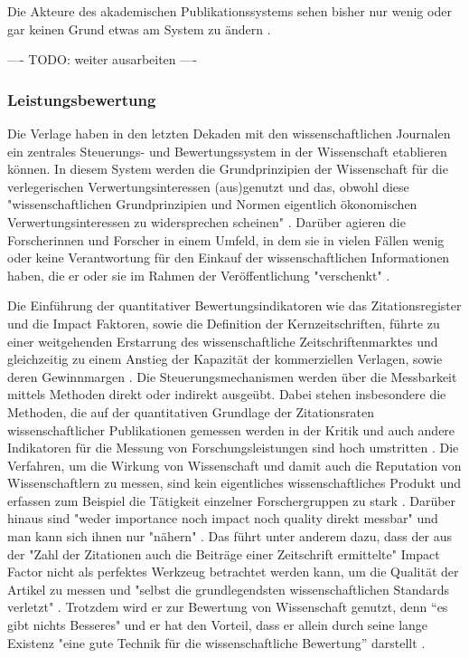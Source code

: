 Die Akteure des akademischen Publikationssystems sehen bisher nur wenig oder gar keinen Grund etwas am System zu ändern \cite{Parks_2002_acadamic_faust}.

---- TODO: weiter ausarbeiten ----

\subsubsection[Leistungsbewertung und Qualität in der Wissenschaft]{Leistungsbewertung}

Die Verlage haben in den letzten Dekaden mit den wissenschaftlichen Journalen ein zentrales Steuerungs- und Bewertungssystem in der Wissenschaft etablieren können. In diesem System werden die Grundprinzipien der Wissenschaft für die verlegerischen Verwertungsinteressen (aus)genutzt und das, obwohl diese "wissenschaftlichen Grundprinzipien und Normen eigentlich ökonomischen Verwertungsinteressen zu widersprechen scheinen" \cite{hanekop_2006}. Darüber agieren die Forscherinnen und Forscher in einem Umfeld, in dem sie in vielen Fällen wenig oder keine Verantwortung für den Einkauf der wissenschaftlichen Informationen haben, die er oder sie im Rahmen der Veröffentlichung "verschenkt" \cite{steele_2006}.

Die Einführung der quantitativer Bewertungsindikatoren wie das Zitationsregister und die Impact Faktoren, sowie die Definition der Kernzeitschriften, führte zu einer weitgehenden Erstarrung des wissenschaftliche Zeitschriftenmarktes und gleichzeitig zu einem Anstieg der Kapazität der kommerziellen Verlagen, sowie deren Gewinnmargen \cite{CREATe_2014}. Die Steuerungsmechanismen werden über die Messbarkeit mittels Methoden direkt oder indirekt ausgeübt. Dabei stehen insbesondere die Methoden, die auf der quantitativen Grundlage der Zitationsraten wissenschaftlicher Publikationen gemessen werden in der Kritik \cite{Brembs_2013} \cite{Dong_2005} und auch andere Indikatoren für die Messung von Forschungsleistungen sind hoch umstritten \cite{Hornbostel_1997} \cite{Hicks_1996} \cite{Havemann_2002}. Die Verfahren, um die Wirkung von Wissenschaft und damit auch die Reputation von Wissenschaftlern zu messen, sind kein eigentliches wissenschaftliches Produkt \cite{suchen} und erfassen zum Beispiel die Tätigkeit einzelner Forschergruppen zu stark \cite{schmoch_2009}. Darüber hinaus sind "weder importance noch impact noch quality direkt messbar" und man kann sich ihnen nur "nähern" \cite{Hornbostel_1997}. Das führt unter anderem dazu, dass der aus der "Zahl der Zitationen auch die Beiträge einer Zeitschrift ermittelte" \cite{weishaupt_2009_goldenOA} Impact Factor nicht als perfektes Werkzeug betrachtet werden kann, um die Qualität der Artikel zu messen \cite{garfield_1999} und "selbst die grundlegendsten wissenschaftlichen Standards verletzt" \cite{Brembs_20013}. Trotzdem wird er zur Bewertung von Wissenschaft genutzt, denn “es gibt nichts Besseres" und er hat den Vorteil, dass er allein durch seine lange Existenz "eine gute Technik für die wissenschaftliche Bewertung” darstellt \cite{garfield_1999} \cite{weishaupt_2009_goldenOA}.

